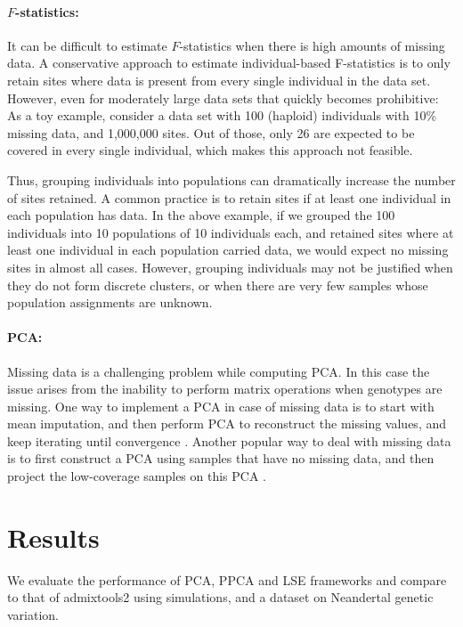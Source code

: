 \documentclass[12pt, letterpaper]{article}
\begin{document}
\paragraph{$F$-statistics:}
It can be difficult to estimate $F$-statistics when there is high amounts of missing data. A conservative approach to estimate individual-based F-statistics is to only retain sites where data is present from every single individual in the data set. However, even for moderately large data sets that quickly becomes prohibitive: As a toy example, consider a data set with 100 (haploid) individuals with 10\% missing data, and 1,000,000 sites. Out of those, only 26 are expected to be covered in every single individual, which makes this approach not feasible.

Thus, grouping individuals into populations can dramatically increase the number of sites retained. A common practice is to retain sites if at least one individual in each population has data. In the above example, if we grouped the 100 individuals into 10 populations of 10 individuals each, and retained sites where at least one individual in each population carried data, we would expect no missing sites in almost all cases. However, grouping individuals may not be justified when they do not form discrete clusters, or when there are very few samples whose population assignments are unknown.

\paragraph{PCA:}
Missing data is a challenging problem while computing PCA. In this case the issue arises from the inability to perform matrix operations when genotypes are missing. One way to implement a PCA in case of missing data is to start with mean imputation, and then perform PCA to reconstruct the missing values, and keep iterating until convergence \cite{meisner_large-scale_2021}. Another popular way to deal with missing data is to first construct a PCA using samples that have no missing data, and then project the low-coverage samples on this PCA \cite{smartpca}.

\section{Results}
We evaluate the performance of PCA, PPCA and LSE frameworks and compare to that of admixtools2 \cite{maier_limits_2022} using simulations, and a dataset on Neandertal genetic variation. 
\end{document}
